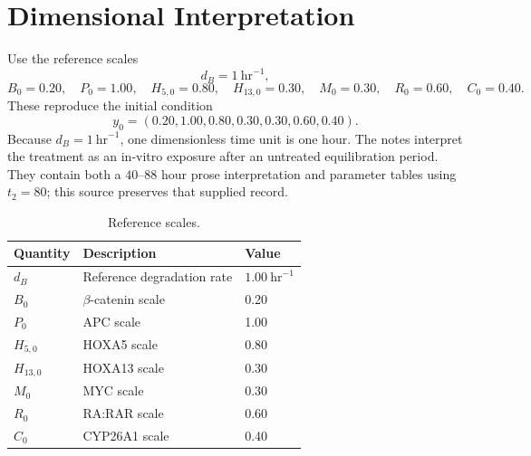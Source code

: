 \documentclass[11pt]{article}
\begin{document}
\section{Dimensional Interpretation}

Use the reference scales
\[
d_B=1~\mathrm{hr}^{-1},
\]
\[
B_0=0.20,\quad P_0=1.00,\quad H_{5,0}=0.80,\quad
H_{13,0}=0.30,\quad M_0=0.30,\quad R_0=0.60,\quad C_0=0.40.
\]
These reproduce the initial condition
\[
y_0=(0.20,1.00,0.80,0.30,0.30,0.60,0.40).
\]
Because \(d_B=1~\mathrm{hr}^{-1}\), one dimensionless time unit is one hour.
The notes interpret the treatment as an in-vitro exposure after an untreated
equilibration period. They contain both a \(40\)--\(88\) hour prose
interpretation and parameter tables using \(t_2=80\); this source preserves
that supplied record.

\begin{table}[H]
\centering
\caption{Reference scales.}
\begin{tabular}{lll}
\toprule
Quantity & Description & Value\\
\midrule
\(d_B\) & Reference degradation rate & \(1.00~\mathrm{hr}^{-1}\)\\
\(B_0\) & \(\beta\)-catenin scale & 0.20\\
\(P_0\) & APC scale & 1.00\\
\(H_{5,0}\) & HOXA5 scale & 0.80\\
\(H_{13,0}\) & HOXA13 scale & 0.30\\
\(M_0\) & MYC scale & 0.30\\
\(R_0\) & RA:RAR scale & 0.60\\
\(C_0\) & CYP26A1 scale & 0.40\\
\bottomrule
\end{tabular}
\end{table}
\end{document}

